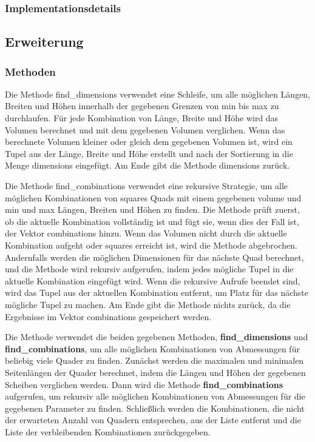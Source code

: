 \documentclass[a4paper,10pt,ngerman]{scrartcl}
\begin{document}
    \subsubsection{Implementationsdetails}\label{subsubsec:implementationsdetails}

    \subsection{Erweiterung}\label{subsec:erweiterung2}

    \subsubsection{Methoden}\label{subsubsec:methoden_erweiterung}

    Die Methode find\_dimensions verwendet eine Schleife, um alle möglichen Längen, Breiten und Höhen innerhalb der gegebenen Grenzen von min bis max zu durchlaufen.
    Für jede Kombination von Länge, Breite und Höhe wird das Volumen berechnet und mit dem gegebenen Volumen verglichen.
    Wenn das berechnete Volumen kleiner oder gleich dem gegebenen Volumen ist,
    wird ein Tupel aus der Länge, Breite und Höhe erstellt und nach der Sortierung in die Menge dimensions eingefügt.
    Am Ende gibt die Methode dimensions zurück.

    Die Methode find\_combinations verwendet eine rekursive Strategie,
    um alle möglichen Kombinationen von squares Quads mit einem gegebenen volume und min und max Längen, Breiten und Höhen zu finden.
    Die Methode prüft zuerst, ob die aktuelle Kombination vollständig ist und fügt sie, wenn dies der Fall ist, der Vektor combinations hinzu.
    Wenn das Volumen nicht durch die aktuelle Kombination aufgeht oder squares erreicht ist, wird die Methode abgebrochen.
    Andernfalls werden die möglichen Dimensionen für das nächste Quad berechnet, und die Methode wird rekursiv aufgerufen,
    indem jedes mögliche Tupel in die aktuelle Kombination eingefügt wird.
    Wenn die rekursive Aufrufe beendet sind, wird das Tupel aus der aktuellen Kombination entfernt, um Platz für das nächste mögliche Tupel zu machen.
    Am Ende gibt die Methode nichts zurück, da die Ergebnisse im Vektor combinations gespeichert werden.

    Die Methode verwendet die beiden gegebenen Methoden, \textbf{find\_dimensions} und \textbf{find\_combinations},
    um alle möglichen Kombinationen von Abmessungen für beliebig viele Quader zu finden.
    Zunächst werden die maximalen und minimalen Seitenlängen der Quader berechnet, indem die Längen und Höhen der gegebenen Scheiben verglichen werden.
    Dann wird die Methode \textbf{find\_combinations} aufgerufen, um rekursiv alle möglichen Kombinationen von Abmessungen für die gegebenen Parameter zu finden.
    Schließlich werden die Kombinationen, die nicht der erwarteten Anzahl von Quadern entsprechen, aus der Liste entfernt
    und die Liste der verbleibenden Kombinationen zurückgegeben.
    \newpage
\end{document}
